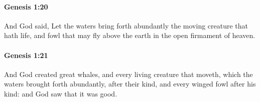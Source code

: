 		\paragraph{Genesis 1:20} %
			\label{GENESIS-1-20}

			And God said, Let the waters bring forth abundantly the moving creature that hath life, and fowl that may fly above the earth in the open firmament of heaven.


		\paragraph{Genesis 1:21} %
			\label{GENESIS-1-21}

			And God created great whales, and every living creature that moveth, which the waters brought forth abundantly, after their kind, and every winged fowl after his kind: and God saw that it was good.



